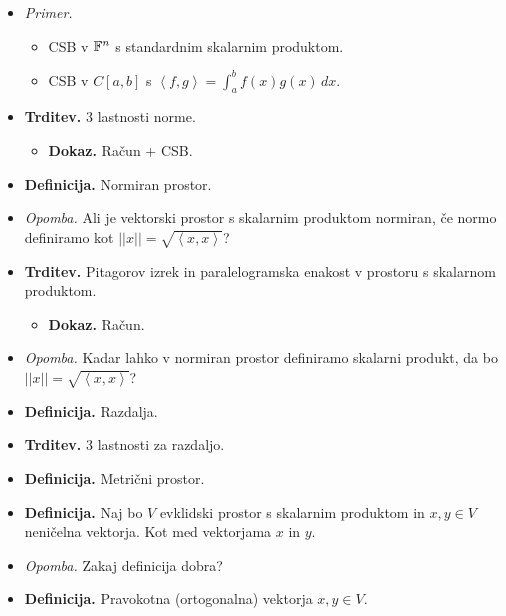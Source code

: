 \begin{enumerate}
\begin{itemize}
\begin{itemize}
        \end{itemize} 
        \item \colorbox{yellow!30}{\emph{Primer.}}         
        \begin{itemize}
            \item CSB v $\mathbb{F}^n$ s standardnim skalarnim produktom.
            \item CSB v $C[a,b]$ s $\left\langle f,g \right\rangle = \int_{a}^{b}f(x)g(x) \, dx$.
        \end{itemize}
        \item \colorbox{blue!30}{\textbf{Trditev.}} 3 lastnosti norme.
        \begin{itemize}
            \item \colorbox{green!30}{\textbf{Dokaz.}} Račun + CSB.
        \end{itemize} 
        \item \colorbox{purple!30}{\textbf{Definicija.}} Normiran prostor.
        \item \colorbox{yellow!30}{\emph{Opomba.}} Ali je vektorski prostor s skalarnim produktom normiran, če normo definiramo kot $||x|| = \sqrt{\left\langle x, x\right\rangle }$?
        \item \colorbox{blue!30}{\textbf{Trditev.}} Pitagorov izrek in paralelogramska enakost v prostoru s skalarnom produktom.
        \begin{itemize}
            \item \colorbox{green!30}{\textbf{Dokaz.}} Račun.
        \end{itemize}
        \item \colorbox{yellow!30}{\emph{Opomba.}} Kadar lahko v normiran prostor definiramo skalarni produkt, da bo $||x|| = \sqrt{\left\langle x, x\right\rangle }$?
        \item \colorbox{purple!30}{\textbf{Definicija.}} Razdalja.
        \item \colorbox{blue!30}{\textbf{Trditev.}} 3 lastnosti za razdaljo.
        \item \colorbox{purple!30}{\textbf{Definicija.}} Metrični prostor.
        \item \colorbox{purple!30}{\textbf{Definicija.}} Naj bo $V$ evklidski prostor s skalarnim produktom in $x, y \in V$ neničelna vektorja. Kot med vektorjama $x$ in $y$.
        \item \colorbox{yellow!30}{\emph{Opomba.}} Zakaj definicija dobra?
        \item \colorbox{purple!30}{\textbf{Definicija.}} Pravokotna (ortogonalna) vektorja $x, y \in V$.

\end{itemize}
\end{enumerate}
